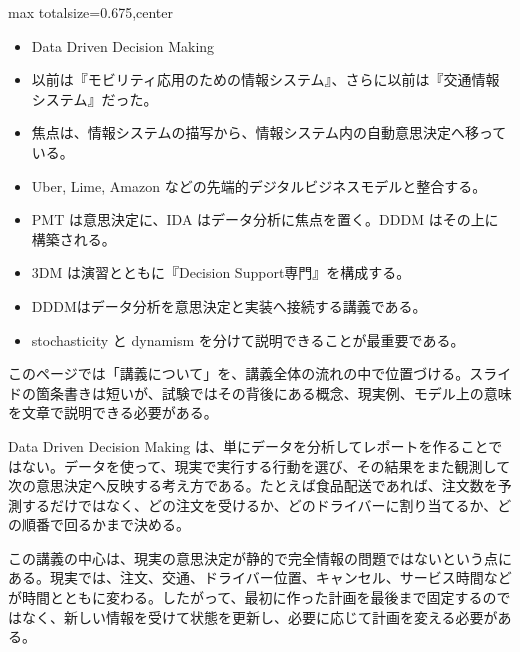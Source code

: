 \clearpage
{}
\begin{adjustbox}{max totalsize={\textwidth}{0.675\textheight},center}
\begin{minipage}{\textwidth}\scriptsize
\begin{minipage}[t]{0.485\textwidth}
\begin{itemize}
\item Data Driven Decision Making
\item 以前は『モビリティ応用のための情報システム』、さらに以前は『交通情報システム』だった。
\item 焦点は、情報システムの描写から、情報システム内の自動意思決定へ移っている。
\item Uber, Lime, Amazon などの先端的デジタルビジネスモデルと整合する。
\item PMT は意思決定に、IDA はデータ分析に焦点を置く。DDDM はその上に構築される。
\item 3DM は演習とともに『Decision Support専門』を構成する。
\end{itemize}
\begin{itemize}
\item DDDMはデータ分析を意思決定と実装へ接続する講義である。
\item stochasticity と dynamism を分けて説明できることが最重要である。
\end{itemize}
\end{minipage}\hfill
\begin{minipage}[t]{0.485\textwidth}
このページでは「講義について」を、講義全体の流れの中で位置づける。スライドの箇条書きは短いが、試験ではその背後にある概念、現実例、モデル上の意味を文章で説明できる必要がある。\par
Data Driven Decision Making は、単にデータを分析してレポートを作ることではない。データを使って、現実で実行する行動を選び、その結果をまた観測して次の意思決定へ反映する考え方である。たとえば食品配送であれば、注文数を予測するだけではなく、どの注文を受けるか、どのドライバーに割り当てるか、どの順番で回るかまで決める。\par
この講義の中心は、現実の意思決定が静的で完全情報の問題ではないという点にある。現実では、注文、交通、ドライバー位置、キャンセル、サービス時間などが時間とともに変わる。したがって、最初に作った計画を最後まで固定するのではなく、新しい情報を受けて状態を更新し、必要に応じて計画を変える必要がある。\par

\end{minipage}
\end{minipage}
\end{adjustbox}
